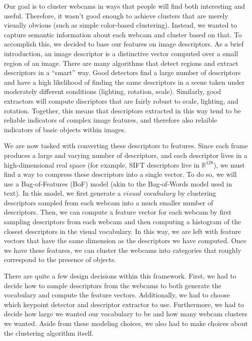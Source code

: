\documentclass{article}
\begin{document}
Our goal is to cluster webcams in ways that people will find both interesting
and useful. Therefore, it wasn't good enough to achieve clusters that are
merely visually obvious (such as simple color-based clustering). Instead, we
wanted to capture semantic information about each webcam and cluster based on
that. To accomplish this, we decided to base our features on image descriptors.
As a brief introduction, an image descriptor is a distinctive vector computed
over a small region of an image. There are many algorithms that detect regions
and extract descriptors in a ``smart'' way. Good detectors find a large number
of descriptors and have a high likelihood of finding the same descriptors in a
scene taken under moderately different conditions (lighting, rotation, scale).
Similarly, good extractors will compute discriptors that are fairly robust to
scale, lighting, and rotation. Together, this means that descriptors extracted
in this way tend to be reliable indicators of complex image features, and
therefore also relaible indicators of basic objects within images.

We are now tasked with converting these descriptors to features. Since each
frame produces a large and varying number of descriptors, and each descriptor
lives in a high-dimensional real space (for example, SIFT descriptors live in
$\mathbb{R}^{128}$), we must find a way to compress these descriptors into a
single vector. To do so, we will use a Bag-of-Features (BoF) model (akin to the
Bag-of-Words model used in text). In this model, we first generate a
$\textit{visual vocabulary}$ by clustering descriptors sampled from each webcam
into a much smaller number of descriptors. Then, we can compute a feature
vector for each webcam by first sampling descriptors from each webcam and then
computing a histogram of the closest descriptors in the visual vocabulary. In
this way, we are left with feature vectors that have the same dimension as the
descriptors we have computed. Once we have these features, we can cluster the
webcams into categories that roughly correspond to the presence of objects.

There are quite a few design decisions within this framework. First, we had to
decide how to sample descriptors from the webcams to both generate the
vocabulary and compute the feature vectors. Additionally, we had to choose
which keypoint detector and descriptor extractor to use. Furthermore, we had to
decide how large we wanted our vocabulary to be and how many webcam clusters we
wanted.  Aside from these modeling choices, we also had to make choices about
the clustering algorithm itself.
\end{document}
